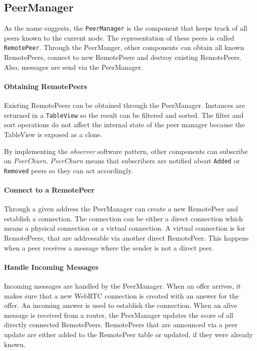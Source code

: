 \subsection{PeerManager}\label{sec:mit-peerManager}

As the name suggests, the \lstinline|PeerManager| is the component that keeps track of all peers known to the current node. The representation of these peers is called \lstinline|RemotePeer|. Through the PeerManger, other components can obtain all known RemotePeers, connect to new RemotePeers and destroy existing RemotePeers. Also, messages are send via the PeerManager.

\paragraph{Obtaining RemotePeers} \label{paragraph:obtain-remotepeers}
Existing RemotePeers can be obtained through the PeerManager. Instances are returned in a \lstinline|TableView| so the result can be filtered and sorted. The filter and sort operations do not affect the internal state of the peer manager because the TableView is exposed as a clone. 

By implementing the \textit{observer} software pattern, other components can subscribe on \textit{PeerChurn}. \textit{PeerChurn} means that subscribers are notified about \lstinline|Added| or \lstinline|Removed| peers so they can act accordingly.

\paragraph{Connect to a RemotePeer}
Through a given address the PeerManager can create a new RemotePeer and establish a connection. The connection can be either a direct connection which means a physical connection or a virtual connection. A virtual connection is  for RemotePeers, that are addressable via another direct RemotePeer. This happens when a peer receives a message where the sender is not a direct peer.

\paragraph{Handle Incoming Messages}
\begin{itemize}
     Incoming \connectionNegotiation messages are handled by the PeerManager. When an offer arrives, it makes sure that a new WebRTC connection is created with an answer for the offer. An incoming answer is used to establish the connection.
     When an alive message is received from a router, the PeerManager updates the score of all directly connected RemotePeers.
     RemotePeers that are announced via a peer update are either added to the RemotePeer table or updated, if they were already known.
\end{itemize}

